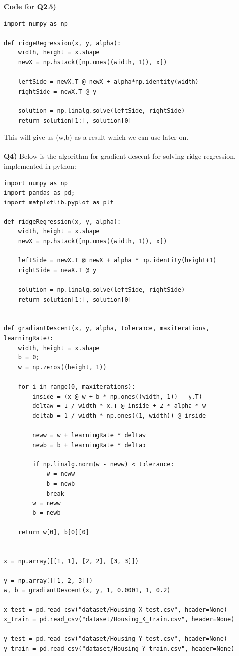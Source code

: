 \documentclass{article}
\begin{document}
\begin{titlepage}
\newpage
\textbf{Code for Q2.5)}
\begin{lstlisting}
import numpy as np

def ridgeRegression(x, y, alpha):
    width, height = x.shape
    newX = np.hstack([np.ones((width, 1)), x])

    leftSide = newX.T @ newX + alpha*np.identity(width)
    rightSide = newX.T @ y

    solution = np.linalg.solve(leftSide, rightSide)
    return solution[1:], solution[0]
\end{lstlisting} 
This will give us (w,b) as a result which we can use later on.\\\\
\textbf{Q4)} Below is the algorithm for gradient descent for solving ridge regression, implemented in python:
\begin{lstlisting}
import numpy as np
import pandas as pd;
import matplotlib.pyplot as plt

def ridgeRegression(x, y, alpha):
    width, height = x.shape
    newX = np.hstack([np.ones((width, 1)), x])

    leftSide = newX.T @ newX + alpha * np.identity(height+1)
    rightSide = newX.T @ y

    solution = np.linalg.solve(leftSide, rightSide)
    return solution[1:], solution[0]


def gradiantDescent(x, y, alpha, tolerance, maxiterations, learningRate):
    width, height = x.shape
    b = 0;
    w = np.zeros((height, 1))

    for i in range(0, maxiterations):
        inside = (x @ w + b * np.ones((width, 1)) - y.T)
        deltaw = 1 / width * x.T @ inside + 2 * alpha * w
        deltab = 1 / width * np.ones((1, width)) @ inside

        neww = w + learningRate * deltaw
        newb = b + learningRate * deltab

        if np.linalg.norm(w - neww) < tolerance:
            w = neww
            b = newb
            break
        w = neww
        b = newb

    return w[0], b[0][0]


x = np.array([[1, 1], [2, 2], [3, 3]])

y = np.array([[1, 2, 3]])
w, b = gradiantDescent(x, y, 1, 0.0001, 1, 0.2)

x_test = pd.read_csv("dataset/Housing_X_test.csv", header=None)
x_train = pd.read_csv("dataset/Housing_X_train.csv", header=None)

y_test = pd.read_csv("dataset/Housing_Y_test.csv", header=None)
y_train = pd.read_csv("dataset/Housing_Y_train.csv", header=None)


\end{lstlisting}
\end{titlepage}
\end{document}
